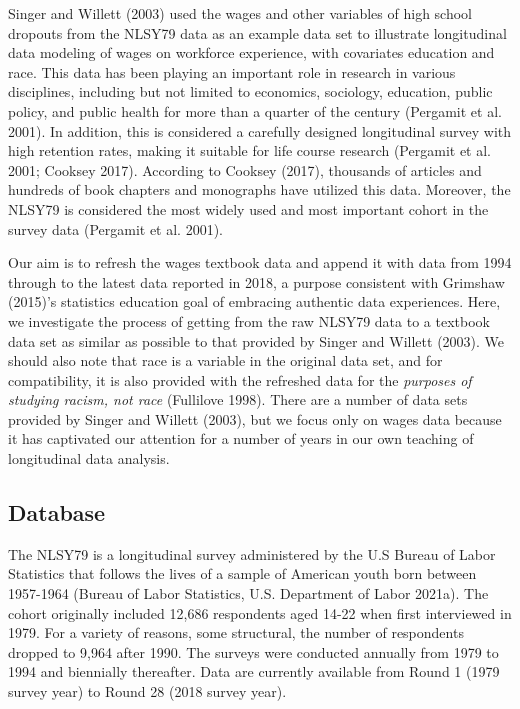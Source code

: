 \documentclass[12pt]{article}
\begin{document}
Singer and Willett (2003) used the wages and other variables of high school dropouts from the NLSY79 data as an example data set to illustrate longitudinal data modeling of wages on workforce experience, with covariates education and race. This data has been playing an important role in research in various disciplines, including but not limited to economics, sociology, education, public policy, and public health for more than a quarter of the century (Pergamit et al. 2001). In addition, this is considered a carefully designed longitudinal survey with high retention rates, making it suitable for life course research (Pergamit et al. 2001; Cooksey 2017). According to Cooksey (2017), thousands of articles and hundreds of book chapters and monographs have utilized this data. Moreover, the NLSY79 is considered the most widely used and most important cohort in the survey data (Pergamit et al. 2001).

Our aim is to refresh the wages textbook data and append it with data from 1994 through to the latest data reported in 2018, a purpose consistent with Grimshaw (2015)'s statistics education goal of embracing authentic data experiences. Here, we investigate the process of getting from the raw NLSY79 data to a textbook data set as similar as possible to that provided by Singer and Willett (2003). We should also note that race is a variable in the original data set, and for compatibility, it is also provided with the refreshed data for the \emph{purposes of studying racism, not race} (Fullilove 1998). There are a number of data sets provided by Singer and Willett (2003), but we focus only on wages data because it has captivated our attention for a number of years in our own teaching of longitudinal data analysis.

\hypertarget{database-1}{%
\subsection{Database}\label{database-1}}

The NLSY79 is a longitudinal survey administered by the U.S Bureau of Labor Statistics that follows the lives of a sample of American youth born between 1957-1964 (Bureau of Labor Statistics, U.S. Department of Labor 2021a). The cohort originally included 12,686 respondents aged 14-22 when first interviewed in 1979. For a variety of reasons, some structural, the number of respondents dropped to 9,964 after 1990. The surveys were conducted annually from 1979 to 1994 and biennially thereafter. Data are currently available from Round 1 (1979 survey year) to Round 28 (2018 survey year).
\end{document}
